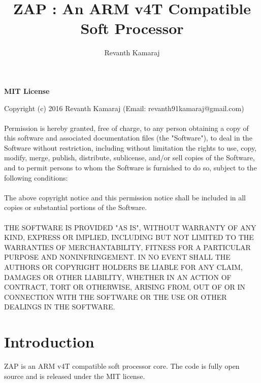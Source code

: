 \documentclass[11pt]{article}
\begin{document}
\title{ ZAP : An ARM v4T Compatible Soft Processor }
\author{Revanth Kamaraj}

\begin{titlepage}
\clearpage\maketitle
\thispagestyle{empty}
\maketitle
\end{titlepage}

\begin{center}
\textbf{MIT License} \\
\end{center}
Copyright (c) 2016 Revanth Kamaraj (Email: revanth91kamaraj@gmail.com) \\\\
Permission is hereby granted, free of charge, to any person obtaining a copy
of this software and associated documentation files (the "Software"), to deal
in the Software without restriction, including without limitation the rights
to use, copy, modify, merge, publish, distribute, sublicense, and/or sell
copies of the Software, and to permit persons to whom the Software is
furnished to do so, subject to the following conditions: \\\\
The above copyright notice and this permission notice shall be included in all
copies or substantial portions of the Software. \\\\
THE SOFTWARE IS PROVIDED "AS IS", WITHOUT WARRANTY OF ANY KIND, EXPRESS OR
IMPLIED, INCLUDING BUT NOT LIMITED TO THE WARRANTIES OF MERCHANTABILITY,
FITNESS FOR A PARTICULAR PURPOSE AND NONINFRINGEMENT. IN NO EVENT SHALL THE
AUTHORS OR COPYRIGHT HOLDERS BE LIABLE FOR ANY CLAIM, DAMAGES OR OTHER
LIABILITY, WHETHER IN AN ACTION OF CONTRACT, TORT OR OTHERWISE, ARISING FROM,
OUT OF OR IN CONNECTION WITH THE SOFTWARE OR THE USE OR OTHER DEALINGS IN THE
SOFTWARE.

\pagebreak
\section{Introduction}

ZAP is an ARM{\textregistered} v4T compatible soft processor core. The code is
fully open source and is released under the MIT license.
\end{document}
